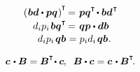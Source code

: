 \nopagebreak\vspace{-0.2em}\begin{equation*}
\begin{array}{r@{\hspace{.3em}}c@{\hspace{.3em}}l}
\left(\hspace{.1ex} \bm{b}\bm{d} \dotp \bm{p}\bm{q} \hspace{.1ex}\right)^{\hspace{-0.1ex}\T} & \hspace{-0.5ex} = & \hspace{-0.1ex} \bm{p}\bm{q}^{\T} \hspace{-0.25ex} \dotp \bm{b}\bm{d}^{\hspace{.1ex}\T}
\\[.2em]
d_i p_i \hspace{.25ex} \bm{b}\bm{q}^{\T} & \hspace{-0.5ex} = & \hspace{-0.1ex} \bm{q}\bm{p} \dotp \bm{d} \bm{b}
\\[.1em]
d_i p_i \hspace{.25ex} \bm{q}\bm{b} & = & p_i d_i \hspace{.25ex} \bm{q}\bm{b}
\hspace{.1ex} .
\end{array}
\end{equation*}

{}

\nopagebreak\vspace{-0.2em}\begin{equation}%
\bm{c} \hspace{.2ex} \dotp \bm{B}
= \bm{B}^{\T} \hspace{-0.4ex} \dotp \bm{c}
\hspace{-0.1ex} ,
\;\;
\bm{B} \dotp \bm{c}
= \bm{c} \hspace{.2ex} \dotp \bm{B}^{\T}
\hspace{-0.3ex} .
\end{equation}



